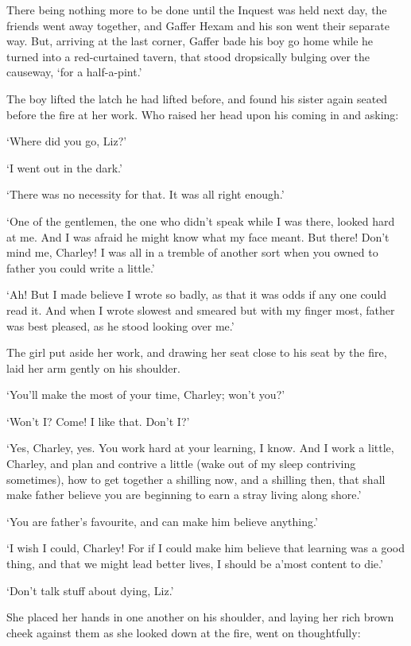 There being nothing more to be done until the Inquest was held next day,
the friends went away together, and Gaffer Hexam and his son went their
separate way. But, arriving at the last corner, Gaffer bade his boy go
home while he turned into a red-curtained tavern, that stood dropsically
bulging over the causeway, ‘for a half-a-pint.’

The boy lifted the latch he had lifted before, and found his sister
again seated before the fire at her work. Who raised her head upon his
coming in and asking:

‘Where did you go, Liz?’

‘I went out in the dark.’

‘There was no necessity for that. It was all right enough.’

‘One of the gentlemen, the one who didn’t speak while I was there,
looked hard at me. And I was afraid he might know what my face meant.
But there! Don’t mind me, Charley! I was all in a tremble of another
sort when you owned to father you could write a little.’

‘Ah! But I made believe I wrote so badly, as that it was odds if any one
could read it. And when I wrote slowest and smeared but with my finger
most, father was best pleased, as he stood looking over me.’

The girl put aside her work, and drawing her seat close to his seat by
the fire, laid her arm gently on his shoulder.

‘You’ll make the most of your time, Charley; won’t you?’

‘Won’t I? Come! I like that. Don’t I?’

‘Yes, Charley, yes. You work hard at your learning, I know. And I work
a little, Charley, and plan and contrive a little (wake out of my
sleep contriving sometimes), how to get together a shilling now, and a
shilling then, that shall make father believe you are beginning to earn
a stray living along shore.’

‘You are father’s favourite, and can make him believe anything.’

‘I wish I could, Charley! For if I could make him believe that learning
was a good thing, and that we might lead better lives, I should be
a’most content to die.’

‘Don’t talk stuff about dying, Liz.’

She placed her hands in one another on his shoulder, and laying her
rich brown cheek against them as she looked down at the fire, went on
thoughtfully:

